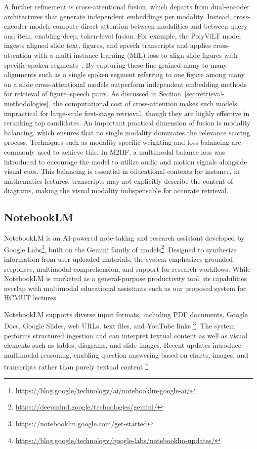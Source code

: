 A further refinement is cross-attentional fusion, which departs from dual-encoder architectures that generate independent embeddings per modality. Instead, cross-encoder models compute direct attention between modalities and between query and item, enabling deep, token-level fusion. For example, the PolyViLT model ingests aligned slide text, figures, and speech transcripts and applies cross-attention with a multi-instance learning (MIL) loss to align slide figures with specific spoken segments~\cite{lee2023lpm}. By capturing these fine-grained many-to-many alignments such as a single spoken segment referring to one figure among many on a slide cross-attentional models outperform independent embedding methods for retrieval of figure–speech pairs. As discussed in Section~\ref{sec:retrieval-methodologies}, the computational cost of cross-attention makes such models impractical for large-scale first-stage retrieval, though they are highly effective in reranking top candidates. An important practical dimension of fusion is modality balancing, which ensures that no single modality dominates the relevance scoring process. Techniques such as modality-specific weighting and loss balancing are commonly used to achieve this. In M2HF, a multimodal balance loss was introduced to encourage the model to utilize audio and motion signals alongside visual cues. This balancing is essential in educational contexts for instance, in mathematics lectures, transcripts may not explicitly describe the content of diagrams, making the visual modality indispensable for accurate retrieval.

\subsection{NotebookLM}

NotebookLM is an AI-powered note-taking and research assistant developed by Google Labs\footnote{\url{https://blog.google/technology/ai/notebooklm-google-ai/}}, built on the Gemini family of models\footnote{\url{https://deepmind.google/technologies/gemini/}}. Designed to synthesize information from user-uploaded materials, the system emphasizes grounded responses, multimodal comprehension, and support for research workflows. While NotebookLM is marketed as a general-purpose productivity tool, its capabilities overlap with multimodal educational assistants such as our proposed system for HCMUT lectures.

NotebookLM supports diverse input formats, including PDF documents, Google Docs, Google Slides, web URLs, text files, and YouTube links \footnote{\url{https://notebooklm.google.com/get-started}}. The system performs structured ingestion and can interpret textual content as well as visual elements such as tables, diagrams, and slide images. Recent updates introduce multimodal reasoning, enabling question answering based on charts, images, and transcripts rather than purely textual content \footnote{\url{https://blog.google/technology/google-labs/notebooklm-updates/}}.

